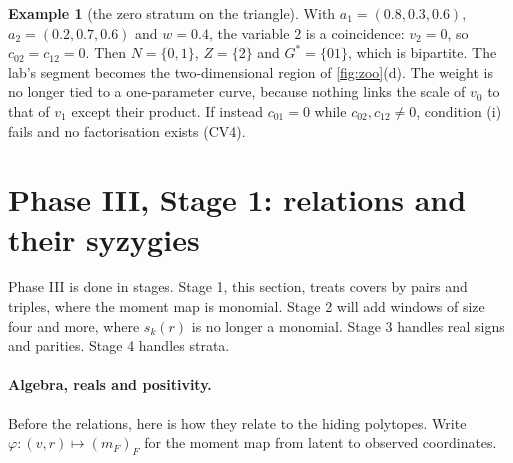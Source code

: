 \documentclass[11pt]{article}
\theoremstyle{definition}\newtheorem{definition}[theorem]{Definition}\newtheorem{remark}[theorem]{Remark}\newtheorem{example}[theorem]{Example}
\begin{document}
\begin{example}[the zero stratum on the triangle]\label{ex:zero}
With $a_1=(0.8,0.3,0.6)$, $a_2=(0.2,0.7,0.6)$ and $w=0.4$, the variable $2$ is a coincidence: $v_2=0$, so $c_{02}=c_{12}=0$. Then
$N=\{0,1\}$, $Z=\{2\}$ and $G^*=\{01\}$, which is bipartite. The lab's segment becomes the two-dimensional region of
\cref{fig:zoo}(d). The weight is no longer tied to a one-parameter curve, because nothing links the scale of $v_0$ to that of $v_1$
except their product. If instead $c_{01}=0$ while $c_{02},c_{12}\ne0$, condition (i) fails and no factorisation exists (CV4).
\end{example}

\section{Phase III, Stage 1: relations and their syzygies}\label{sec:syz}
Phase III is done in stages. Stage 1, this section, treats covers by pairs and triples, where the moment map is monomial. Stage 2 will
add windows of size four and more, where $s_k(r)$ is no longer a monomial. Stage 3 handles real signs and parities. Stage 4 handles strata.

\paragraph{Algebra, reals and positivity.} Before the relations, here is how they relate to the hiding polytopes. Write
$\varphi:(v,r)\mapsto(m_F)_F$ for the moment map from latent to observed coordinates.
\end{document}
